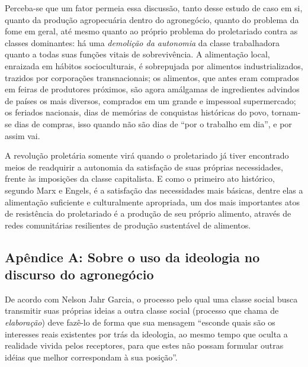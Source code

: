 \documentclass[12pt]{article}
\numberwithin{equation}{section}
\theoremstyle{plain}
\theoremstyle{definition}
\theoremstyle{remark}
\begin{document}
Perceba-se que um fator permeia essa discussão, tanto desse estudo de caso em si, quanto da produção agropecuária dentro do agronegócio, quanto do problema da fome em geral, até mesmo quanto ao próprio problema do proletariado contra as classes dominantes: há uma \textit{demolição da autonomia} da classe trabalhadora quanto a todas suas funções vitais de sobrevivência. A alimentação local, enraizada em hábitos socioculturais, é sobrepujada por alimentos industrializados, trazidos por corporações transnacionais; os alimentos, que antes eram comprados em feiras de produtores próximos, são agora amálgamas de ingredientes advindos de países os mais diversos, comprados em um grande e impessoal supermercado; os feriados nacionais, dias de memórias de conquistas históricas do povo, tornam-se dias de compras, isso quando não são dias de ``por o trabalho em dia'', e por assim vai.

A revolução proletária somente virá quando o proletariado já tiver encontrado meios de readquirir a autonomia da satisfação de suas próprias necessidades, frente às imposições da classe capitalista. E como o primeiro ato histórico, segundo Marx e Engels, é a satisfação das necessidades mais básicas, dentre elas a alimentação suficiente e culturalmente apropriada, um dos mais importantes atos de resistência do proletariado é a produção de seu próprio alimento, através de redes comunitárias resilientes de produção sustentável de alimentos.

\hypertarget{apuxeandice-a-sobre-o-uso-da-ideologia-no-discurso-do-agroneguxf3cio}{%
\subsection{Apêndice A: Sobre o uso da ideologia no discurso do agronegócio}\label{apuxeandice-a-sobre-o-uso-da-ideologia-no-discurso-do-agroneguxf3cio}}

De acordo com Nelson Jahr Garcia, o processo pelo qual uma classe social busca transmitir suas próprias ideias a outra classe social (processo que chama de \textit{elaboração}) deve fazê-lo de forma que sua mensagem ``esconde quais são os interesses reais existentes por trás da ideologia, ao mesmo tempo que oculta a realidade vivida pelos receptores, para que estes não possam formular outras idéias que melhor correspondam à sua posição''.
\end{document}

